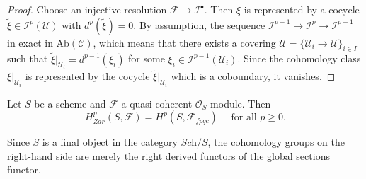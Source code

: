 \begin{proof}
Choose an injective resolution $\mathcal{F} \to \mathcal{I}^\bullet$. Then 
$\xi$ is represented by a cocycle $\tilde{\xi} \in \mathcal{I}^p(\mathcal{U})$ 
with $d^p(\tilde{\xi}) = 0$. By assumption, the sequence $\mathcal{I}^{p-1} \to 
\mathcal{I}^{p} \to \mathcal{I}^{p+1}$ in exact in $\text{Ab}(\mathcal{C})$, 
which means that there exists a covering $\mathcal{U} = \{ \mathcal{U}_i \to 
\mathcal{U} \}_{i \in I}$ such that $\tilde{\xi}|_{\mathcal{U}_i} = 
d^{p-1}(\xi_i)$ for some $\xi_i \in \mathcal{I}^{p-1}(\mathcal{U}_i)$. Since 
the cohomology class $\xi|_{\mathcal{U}_i}$ is represented by the cocycle 
$\tilde{\xi}|_{\mathcal{U}_i}$ which is a coboundary, it vanishes.
\end{proof}

\begin{theorem}
\label{thm:ZarIsFpqcForQCoh}
Let $S$ be a scheme and $\mathcal{F}$ a quasi-coherent $\mathcal{O}_S$-module. 
Then 
$$
H_{Zar}^p(S, \mathcal{F}) = H^p(S, \mathcal{F}_{fpqc}) \quad \text{ for all } 
p\geq 0.
$$
\end{theorem}

\begin{remark}
Since $S$ is a final object in the category $\textit{Sch}/S$, the cohomology 
groups on the right-hand side are merely the right derived functors of the 
global sections functor.
\end{remark}

